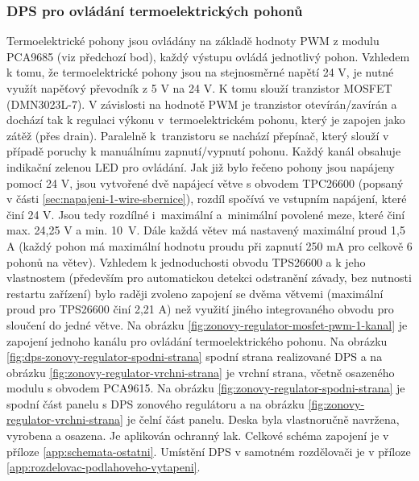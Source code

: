 \subsubsection{DPS pro ovládání termoelektrických pohonů}
Termoelektrické pohony jsou ovládány na základě hodnoty PWM z modulu PCA9685 (viz předchozí bod), každý výstupu ovládá jednotlivý pohon. Vzhledem k tomu, že termoelektrické pohony jsou na stejnosměrné napětí 24 V, je nutné využít napěťový převodník z 5 V na 24 V. K tomu slouží tranzistor MOSFET (DMN3023L-7). V závislosti na hodnotě PWM je tranzistor otevírán/zavírán a dochází tak k regulaci výkonu v~termoelektrickém pohonu, který je zapojen jako zátěž (přes drain). Paralelně k~tranzistoru se nachází přepínač, který slouží v případě poruchy k manuálnímu zapnutí/vypnutí pohonu.  Každý kanál obsahuje indikační zelenou LED pro ovládání. Jak již bylo řečeno pohony jsou napájeny pomocí 24 V, jsou vytvořené dvě napájecí větve s obvodem TPC26600 (popsaný v části \ref{sec:napajeni-1-wire-sbernice}), rozdíl spočívá ve vstupním napájení, které činí 24 V. Jsou tedy rozdílné i~maximální a~minimální povolené meze, které činí max. 24,25 V a min. 10~V. Dále každá větev má nastavený maximální proud 1,5 A (každý pohon má maximální hodnotu proudu při zapnutí 250 mA pro celkově 6 pohonů na větev). Vzhledem k jednoduchosti obvodu TPS26600 a k jeho vlastnostem (především pro automatickou detekci odstranění závady, bez nutnosti restartu zařízení) bylo raději zvoleno zapojení se dvěma větvemi (maximální proud pro TPS26600 činí 2,21 A) než využití jiného integrovaného obvodu pro sloučení do jedné větve. Na obrázku \ref{fig:zonovy-regulator-mosfet-pwm-1-kanal} je zapojení jednoho kanálu pro ovládání termoelektrického pohonu.  Na obrázku \ref{fig:dps-zonovy-regulator-spodni-strana} spodní strana realizované DPS a na obrázku \ref{fig:zonovy-regulator-vrchni-strana} je vrchní strana, včetně osazeného modulu s obvodem PCA9615. Na obrázku \ref{fig:zonovy-regulator-spodni-strana} je spodní část panelu s DPS zonového regulátoru a na obrázku \ref{fig:zonovy-regulator-vrchni-strana} je čelní část panelu. Deska byla vlastnoručně navržena, vyrobena a osazena. Je aplikován ochranný lak. Celkové schéma zapojení je v příloze \ref{app:schemata-ostatni}. Umístění DPS v samotném rozdělovači je v příloze \ref{app:rozdelovac-podlahoveho-vytapeni}.


